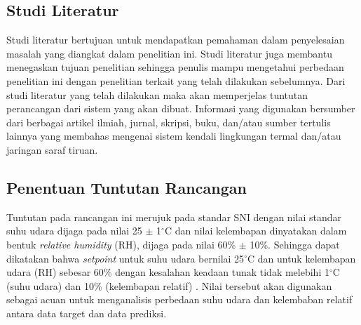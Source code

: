

\subsection{Studi Literatur}
Studi literatur bertujuan untuk mendapatkan pemahaman dalam penyelesaian masalah yang diangkat dalam penelitian ini. Studi literatur juga membantu menegaskan tujuan penelitian sehingga penulis mampu mengetahui perbedaan penelitian ini dengan penelitian terkait yang telah dilakukan sebelumnya. Dari studi literatur yang telah dilakukan maka akan memperjelas tuntutan perancangan dari sistem yang akan dibuat. Informasi yang digunakan bersumber dari berbagai artikel ilmiah, jurnal, skripsi, buku, dan/atau sumber tertulis lainnya yang membahas mengenai sistem kendali lingkungan termal dan/atau jaringan saraf tiruan.

\subsection{Penentuan Tuntutan Rancangan}

Tuntutan pada rancangan ini merujuk pada standar SNI dengan nilai standar suhu udara dijaga pada nilai 25 $\pm$ 1$^{\circ}$C dan nilai kelembapan dinyatakan dalam bentuk \textit{relative humidity} (RH), dijaga pada nilai 60\% $\pm$ 10\%. Sehingga dapat dikatakan bahwa \textit{setpoint} untuk suhu udara bernilai 25$^{\circ}$C dan untuk kelembapan udara (RH) sebesar 60\% dengan kesalahan keadaan tunak tidak melebihi 1$^{\circ}$C (suhu udara) dan 10\% (kelembapan relatif) \cite{SNI-03-06390-2000}. Nilai tersebut akan digunakan sebagai acuan untuk menganalisis perbedaan suhu udara dan kelembaban relatif antara data target dan data prediksi.

